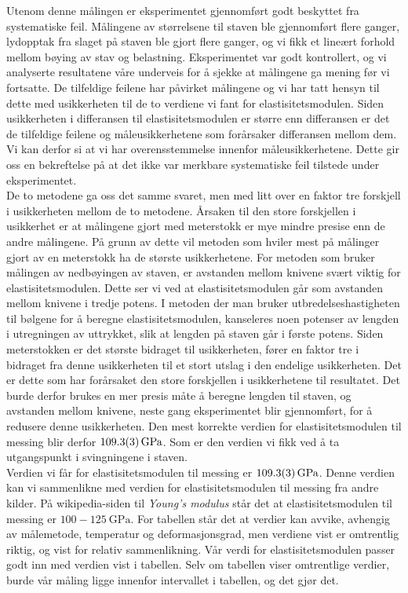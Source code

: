 \documentclass[%
 reprint,
 amsmath,amssymb,
 aps,
 norsk,
 booktabs
]{revtex4-1}
\begin{document}
Utenom denne målingen er eksperimentet gjennomført godt beskyttet fra systematiske feil. Målingene av størrelsene til staven ble gjennomført flere ganger, lydopptak fra slaget på staven ble gjort flere ganger, og vi fikk et lineært forhold mellom bøying av stav og belastning. Eksperimentet var godt kontrollert, og vi analyserte resultatene våre underveis for å sjekke at målingene ga mening før vi fortsatte. De tilfeldige feilene har påvirket målingene og vi har tatt hensyn til dette med usikkerheten til de to verdiene vi fant for elastisitetsmodulen. Siden usikkerheten i differansen til elastisitetsmodulen er større enn differansen er det de tilfeldige feilene og måleusikkerhetene som forårsaker differansen mellom dem. Vi kan derfor si at vi har overensstemmelse innenfor måleusikkerhetene. Dette gir oss en bekreftelse på at det ikke var merkbare systematiske feil tilstede under eksperimentet.
\\De to metodene ga oss det samme svaret, men med litt over en faktor tre forskjell i usikkerheten mellom de to metodene. Årsaken til den store forskjellen i usikkerhet er at målingene gjort med meterstokk er mye mindre presise enn de andre målingene. På grunn av dette vil metoden som hviler mest på målinger gjort av en meterstokk ha de største usikkerhetene. For metoden som bruker målingen av nedbøyingen av staven, er avstanden mellom knivene svært viktig for elastisitetsmodulen. Dette ser vi ved at elastisitetsmodulen går som avstanden mellom knivene i tredje potens. I metoden der man bruker utbredelseshastigheten til bølgene for å beregne elastisitetsmodulen, kanseleres noen potenser av lengden i utregningen av uttrykket, slik at lengden på staven går i første potens. Siden meterstokken er det største bidraget til usikkerheten, fører en faktor tre i bidraget fra denne usikkerheten til et stort utslag i den endelige usikkerheten. Det er dette som har forårsaket den store forskjellen i usikkerhetene til resultatet. Det burde derfor brukes en mer presis måte å beregne lengden til staven, og avstanden mellom knivene, neste gang eksperimentet blir gjennomført, for å redusere denne usikkerheten. Den mest korrekte verdien for elastisitetsmodulen til messing blir derfor $\SI{109.3\pm0.3}{\giga\pascal}$. Som er den verdien vi fikk ved å ta utgangspunkt i svingningene i staven. \\
Verdien vi får for elastisitetsmodulen til messing er $\SI{109.3\pm0.3}{\giga\pascal}$. Denne verdien kan vi sammenlikne med verdien for elastisitetsmodulen til messing fra andre kilder. På wikipedia-siden til \textit{Young's modulus} \cite{wiki1} står det at elastisitetsmodulen til messing er $100-\SI{125}{\giga\pascal}$. For tabellen står det at verdier kan avvike, avhengig av målemetode, temperatur og deformasjonsgrad, men verdiene vist er omtrentlig riktig, og vist for relativ sammenlikning. Vår verdi for elastisitetsmodulen passer godt inn med verdien vist i tabellen. Selv om tabellen viser omtrentlige verdier, burde vår måling ligge innenfor intervallet i tabellen, og det gjør det.
\end{document}

